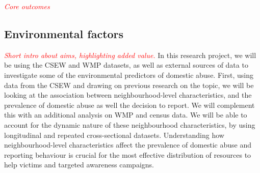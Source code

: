 \documentclass[11pt, a4paper]{article}
\begin{document}





%
%
% 
%
%
%
%
%

\textcolor{red}{\textit{Core outcomes}}

\newpage

\subsection*{Environmental factors}

\textcolor{red}{\textit{Short intro about aims, highlighting added value.}}
In this research project, we will be using the CSEW and WMP datasets, as well as external sources of data to investigate some of the environmental predictors of domestic abuse. First, using data from the CSEW and drawing on previous research on the topic, we will be looking at the association between neighbourhood-level characteristics, and the prevalence of domestic abuse as well the decision to report. We will complement this with an additional analysis on WMP and census data. We will be able to account for the dynamic nature of these neighbourhood characteristics, by using longitudinal and repeated cross-sectional datasets. Understanding how neighbourhood-level characteristics affect the prevalence of domestic abuse and reporting behaviour is crucial for the most effective distribution of resources to help victims and targeted awareness campaigns. 
\end{document}
